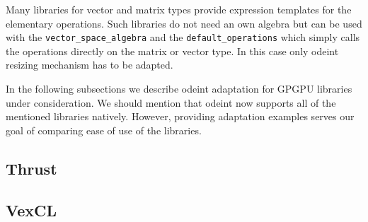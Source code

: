 \documentclass[1p]{elsarticle}
\newcommand{\code}[1]{\lstinline|#1|}
\newcommand {\rem}[1]{}
\begin{document}
\rem{
An example of using a range algebra is provided below:
\begin{lstlisting}
typedef std::array<double, 3> state_type;
state_type x1, x2;
// Initialize x1 and x2.

double dt = 0.1;
odeint::range_algebra algebra;
// The following line computes x1 = dt * x2 for all elements of x1 and x2:
algebra.for_each2(x1, x2, default_operations::scale_sum1(dt));
\end{lstlisting}
Here \code{for_each2} is used, which means that
two state types are iterated. The operation is a \code{scale_sum1} which simply
calculates \code{x1[i] = dt * x2[i]}. Odeint provides a set of predefined
algebras, which includes:
\begin{itemize}
    \item \code{range_algebra}: default algebra which works on Boost.Ranges
    \item \code{array_algebra}: specialized algebra for boost::array
    \item \code{fusion_algebra}: algebra for compile-time sequences like
        \code{boost::fusion::vector}, \code{std::tuple}, etc.
    \item \code{vector_space_algebra}: algebra for vector space types which
        provide overloaded arithmetic operators for elementwise operations.
\end{itemize}
}

Many libraries for vector and matrix types provide expression templates for the
elementary operations. Such libraries do not need an own algebra but can be
used with the \code{vector_space_algebra} and the \code{default_operations}
which simply calls the operations directly on the matrix or vector type. In
this case only odeint resizing mechanism has to be adapted.

In the following subsections we describe odeint adaptation for GPGPU libraries
under consideration. We should mention that odeint now supports all of the
mentioned libraries natively. However, providing adaptation examples serves our
goal of comparing ease of use of the libraries.

\subsection{Thrust}
\subsection{VexCL}
\end{document}
